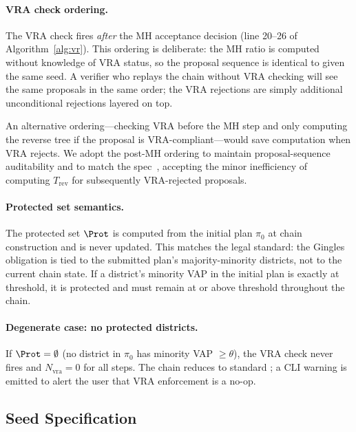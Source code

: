 \paragraph{VRA check ordering.}
The VRA check fires \emph{after} the MH acceptance decision (line 20--26 of
Algorithm~\ref{alg:vr}).
This ordering is deliberate: the MH ratio is computed without knowledge of
VRA status, so the proposal sequence is identical to \fr{} given the same seed.
A verifier who replays the chain without VRA checking will see the same
proposals in the same order; the VRA rejections are simply additional
unconditional rejections layered on top.

An alternative ordering---checking VRA before the MH step and only computing
the reverse tree if the proposal is VRA-compliant---would save computation
when VRA rejects.
We adopt the post-MH ordering to maintain proposal-sequence auditability and
to match the spec~\citep{dellaLibera2026vraSection}, accepting the minor
inefficiency of computing $T_{\mathrm{rev}}$ for subsequently VRA-rejected
proposals.

\paragraph{Protected set semantics.}
The protected set $\Prot$ is computed from the initial plan $\pi_0$ at chain
construction and is never updated.
This matches the legal standard: the Gingles obligation is tied to the
submitted plan's majority-minority districts, not to the current chain state.
If a district's minority VAP in the initial plan is exactly at threshold,
it is protected and must remain at or above threshold throughout the chain.

\paragraph{Degenerate case: no protected districts.}
If $\Prot = \emptyset$ (no district in $\pi_0$ has minority VAP $\geq \theta$),
the VRA check never fires and $N_{\mathrm{vra}} = 0$ for all steps.
The chain reduces to standard \fr{}; a CLI warning is emitted to alert the
user that VRA enforcement is a no-op.

\subsection{Seed Specification}

